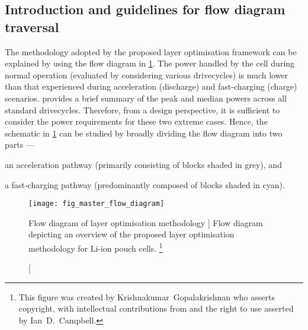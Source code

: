 

\subsection{Introduction and guidelines for flow diagram traversal}

The  methodology adopted  by the  proposed layer  optimisation framework  can be
explained by  using the  flow diagram in  \cref{fig:fig_strategy_schematic}. The
power  handled by  the cell  during normal  operation (evaluated  by considering
various drivecycles)  is much  lower than  that experienced  during acceleration
(discharge)  and  fast-charging (charge)  scenarios.  
provides  a brief  summary of  the peak  and median  powers across  all standard
drivecycles. Therefore, from a design  perspective, it is sufficient to consider
the power  requirements for  these two  extreme cases.  Hence, the  schematic in
\cref{fig:fig_strategy_schematic} can  be studied  by broadly dividing  the flow
diagram into two parts ---
\begin{enumerate*}[label=\roman*)]
    \item an acceleration pathway (primarily consisting of blocks shaded in grey), and
    \item a fast-charging pathway (predominantly composed of blocks shaded in cyan).
\end{enumerate*}

\begin{figure}[p]
    \begin{minipage}[t]{\textwidth}
        \centering
        \texttt{[image: fig\_master\_flow\_diagram]}
        \captionsetup{labelsep=note}
        \caption
        [%
        Flow diagram of layer optimisation methodology
        ]%
        {%
            Flow diagram depicting an overview of the proposed layer optimisation methodology
            for Li-ion pouch cells.
        }%
        \label{fig:fig_strategy_schematic}
        \mpfootnotes[1]
        \vspace*{0.7225cm}
        \footnote{This figure was created by \mbox{Krishnakumar Gopalakrishnan} who
            asserts copyright, with intellectual contributions from and the right to
        use asserted by \mbox{Ian D.\ Campbell}.}
    \end{minipage}
\end{figure}

